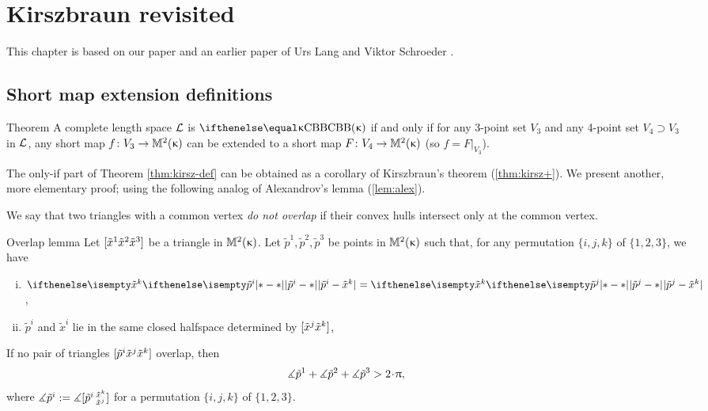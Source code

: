 \chapter{Kirszbraun revisited}

This chapter is based on our paper \cite{alexander-kapovitch-kirszbraun}
and an earlier paper of Urs Lang and  Viktor Schroeder
\cite{lang-schroeder}.


\section{Short map extension definitions}\label{sec:4pt}

\begin{thm}{Theorem}\label{thm:kirsz-def} 
A complete length space
$\mathcal{L}$ is $\Alex\kappa$ if and only if for any 3-point set $V_3$ and any 4-point set $V_4\supset V_3$ in $\mathcal{L}$, 
any short map $f\:V_3\to\Lob2\kappa$ can be extended to a short map $F\:V_4\to\Lob2\kappa$ (so $f=F|_{V_3}$).
\end{thm}

The only-if part of Theorem \ref{thm:kirsz-def} can be obtained as a corollary of Kirszbraun's theorem (\ref{thm:kirsz+}).
We present another, more elementary proof; using the following analog of Alexandrov's lemma (\ref{lem:alex}).

We say that  two triangles with a common vertex \emph{do not overlap} if their convex hulls intersect only at the common vertex.


\begin{thm}{Overlap lemma}\label{lem:extend-overlap}
Let $[{\tilde x^1}{\tilde x^2}{\tilde x^3}]$ be a triangle in $\mathbb{M}_{{}}^{2}({\upkappa})$.  Let $\tilde p^1,\tilde p^2,\tilde p^3$ be points  in $\mathbb{M}_{{}}^{2}({\upkappa})$ such that, for any permutation $\{i,j,k\}$ of $\{1,2,3\}$, we have
\begin{enumerate}[(i)]

\item 
\label{no-overlap:px=px}
$\dist{\tilde p^i}{\tilde x^\kay}{}=\dist{\tilde p^j}{\tilde x^\kay}{}$,

\item
\label{no-overlap:orient-1}
$\tilde p^i$ and $\tilde x^i$ lie in the same closed halfspace determined by $[\tilde x^j\tilde x^k]$,  
\end{enumerate}

If no pair of triangles $[{\tilde p^i}{\tilde x^j}{\tilde x^k}]$ overlap,
then 
\[\mangle{\tilde p^1} +\mangle {\tilde p^2}+\mangle{\tilde p^3}> 2\cdot\pi,\]
where $\measuredangle\tilde p^i:=\measuredangle[\tilde p^i\,{}^{\tilde x^k}_{\tilde x^j}]$
for a permutation $\{i,j,k\}$ of $\{1,2,3\}$.
\end{thm}


